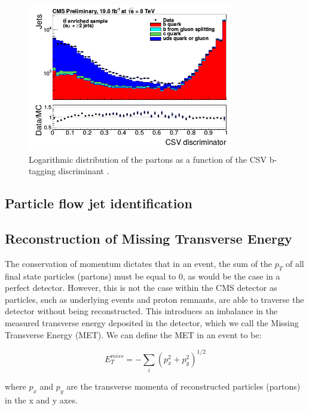 \begin{figure} \label{fig-CSVDiscriminator}
\begin{center}
\includegraphics[width=0.8\textwidth]{Figures/CSVDiscriminator.png}
\caption{Logarithmic distribution of the partons as a function of the CSV b-tagging discriminant \cite{PhilThesis}.}
\end{center}
\end{figure}


\subsection{Particle flow jet identification} \label{subsec-PFJetIdentification}

\subsection{Reconstruction of Missing Transverse Energy}

The conservation of momentum dictates that in an event, the sum of the $p_T$ of all final state particles (partons) must be equal to 0, as would be the case in a perfect detector. However, this is not the case within the CMS detector as particles, such as underlying events and proton remnants, are able to traverse the detector without being reconstructed. This introduces an imbalance in the measured transverse energy deposited in the detector, which we call the Missing Transverse Energy (MET). We can define the MET in an event to be:

\begin{equation}
E^{miss}_T = - \sum_i(p^2_x + p^2_y)^{1/2}
\end{equation}

where $p_x$ and $p_y$ are the transverse momenta of reconstructed particles (partons) in the x and y axes.

